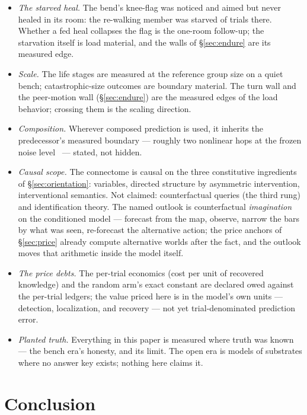 \documentclass[11pt,a4paper]{article}
\begin{document}
\begin{itemize}
\item \emph{The starved heal.} The bend's knee-flag was noticed and
aimed but never healed in its room: the re-walking member was starved
of trials there. Whether a fed heal collapses the flag is the
one-room follow-up; the starvation itself is load material, and the
walls of \S\ref{sec:endure} are its measured edge.
\item \emph{Scale.} The life stages are measured at the reference
group size on a quiet bench; catastrophic-size outcomes are boundary
material. The turn wall and the peer-motion wall
(\S\ref{sec:endure}) are the measured edges of the load behavior;
crossing them is the scaling direction.
\item \emph{Composition.} Wherever composed prediction is used, it
inherits the predecessor's measured boundary --- roughly two
nonlinear hops at the frozen noise level~\cite{p3} --- stated, not
hidden.
\item \emph{Causal scope.} The connectome is causal on the three
constitutive ingredients of \S\ref{sec:orientation}: variables,
directed structure by asymmetric intervention, interventional
semantics. Not claimed: counterfactual queries (the third rung) and
identification theory. The named outlook is counterfactual
\emph{imagination} on the conditioned model --- forecast from the
map, observe, narrow the bars by what was seen, re-forecast the
alternative action; the price anchors of \S\ref{sec:price} already
compute alternative worlds after the fact, and the outlook moves
that arithmetic inside the model itself.
\item \emph{The price debts.} The per-trial economics (cost per unit
of recovered knowledge) and the random arm's exact constant are
declared owed against the per-trial ledgers; the value priced here
is in the model's own units --- detection, localization, and
recovery --- not yet trial-denominated prediction error.
\item \emph{Planted truth.} Everything in this paper is measured
where truth was known --- the bench era's honesty, and its limit.
The open era is models of substrates where no answer key exists;
nothing here claims it.
\end{itemize}

\section{Conclusion}
\label{sec:conclusion}
\end{document}
